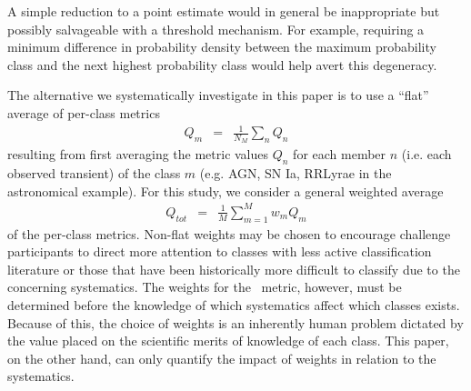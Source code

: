 A simple reduction to a point estimate would in general be inappropriate but possibly salvageable with a threshold mechanism.
For example, requiring a minimum difference in probability density between the maximum probability class and the next highest probability class would help avert this degeneracy.

The alternative we systematically investigate in this paper is to use a ``flat'' average of per-class metrics
\begin{eqnarray}
  \label{eq:perclassavg}
Q_{m} &=& \frac{1}{N_{M}}\sum_{n}Q_{n}
\end{eqnarray}
resulting from first averaging the metric values $Q_{n}$ for each member $n$ (i.e. each observed transient) of the class $m$ (e.g. AGN, SN Ia, RRLyrae in the astronomical example).
For this study, we consider a general weighted average
\begin{eqnarray}
  \label{eq:weightavg}
Q_{tot} &=& \frac{1}{M}\sum_{m=1}^{M}w_{m}Q_{m}
\end{eqnarray}
of the per-class metrics.
Non-flat weights may be chosen to encourage challenge participants to direct more attention to classes with less active classification literature or those that have been historically more difficult to classify due to the concerning systematics.
The weights for the \plasticc\ metric, however, must be determined before the knowledge of which systematics affect which classes exists.
Because of this, the choice of weights is an inherently human problem dictated by the value placed on the scientific merits of knowledge of each class.
This paper, on the other hand, can only quantify the impact of weights in relation to the systematics.
